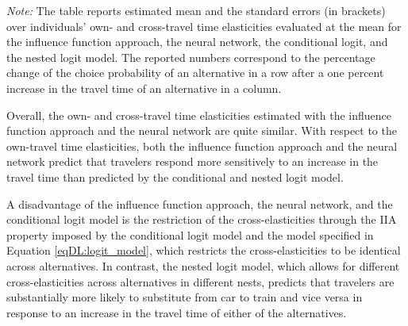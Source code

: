 \documentclass[a4paper, 12pt]{article}
\begin{document}
\begin{table}[H]
\begin{tabular}{lcccccc}
 \bottomrule%
 \end{tabular} 
\begin{minipage}{0.95\textwidth} %
		{   \footnotesize \begin{singlespace}
\textit{Note:} The table reports estimated mean and the standard errors (in brackets) over  individuals' own- and cross-travel time elasticities evaluated at the mean for the influence function approach, the neural network, the conditional logit, and the nested logit model. The reported numbers  correspond to the   percentage change of the choice probability of an alternative in a row after a one percent increase in the travel time of an alternative in a column.
			\end{singlespace}
			\par}
	\end{minipage}
\end{table}
Overall, the own- and cross-travel time elasticities estimated with the influence function approach and the neural network are quite similar. With respect to the own-travel time elasticities, both the influence function approach and the neural network predict that travelers respond more sensitively to an increase in the travel time than predicted by the conditional and nested logit model.

A disadvantage  of the influence function approach, the neural network, and the conditional logit model is the restriction  of the cross-elasticities through the IIA property imposed by the conditional logit model and the model specified in Equation \eqref{eqDL:logit_model}, which restricts the cross-elasticities to be identical across alternatives. In contrast, the nested logit model, which allows for different cross-elasticities across alternatives in different nests, predicts that travelers are substantially more likely to substitute from car to train and vice versa in response to an increase in the travel time of either of the alternatives.
\end{document}

